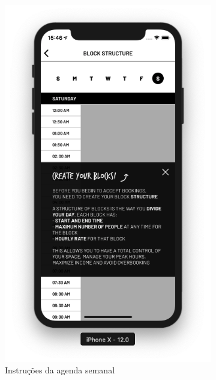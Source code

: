 \begin{figure}[H]
	\centering
    \begin{subfigure}[b]{0.3\textwidth}
        \includegraphics[width=\textwidth]{pfc/figuras/gym-block-structure-onboard.png}
        \caption{Instruções da agenda semanal}
        \label{fig:gym-block-onboard}
    \end{subfigure}
    ~
	\begin{subfigure}[b]{0.3\textwidth}

\end{subfigure}
\end{figure}
